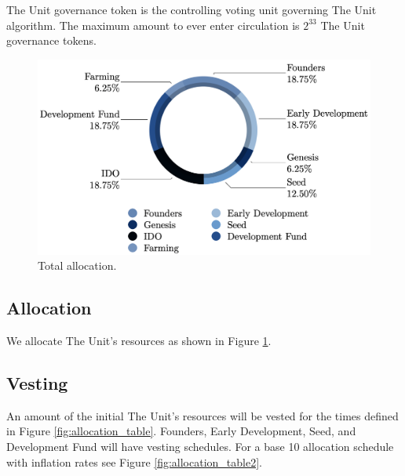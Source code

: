 \documentclass[12pt]{article}
\begin{document}
The Unit governance token is the controlling voting unit governing The Unit algorithm. The maximum amount to ever enter circulation is $2^{33}$ The Unit governance tokens.

\begin{figure}[h!]
\centering
  \includegraphics[width=5in]{images/The_Unit_Allocation.png}
  \caption{Total allocation.}
  \label{fig:allocation}
\end{figure}



\newpage

\subsection{Allocation}

We allocate The Unit's resources as shown in Figure \ref{fig:allocation}. 



\subsection{Vesting}

An amount of the initial The Unit's resources will be vested for the times defined in Figure \ref{fig:allocation_table}. Founders, Early Development, Seed, and Development Fund will have vesting schedules. For a base 10 allocation schedule with inflation rates see Figure \ref{fig:allocation_table2}.
\end{document}
